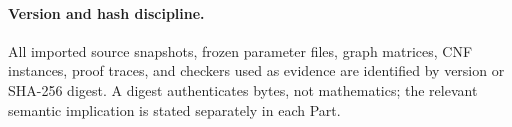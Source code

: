 \paragraph{Version and hash discipline.}
All imported source snapshots, frozen parameter files, graph matrices, CNF
instances, proof traces, and checkers used as evidence are identified by
version or SHA-256 digest.  A digest authenticates bytes, not mathematics;
the relevant semantic implication is stated separately in each Part.
